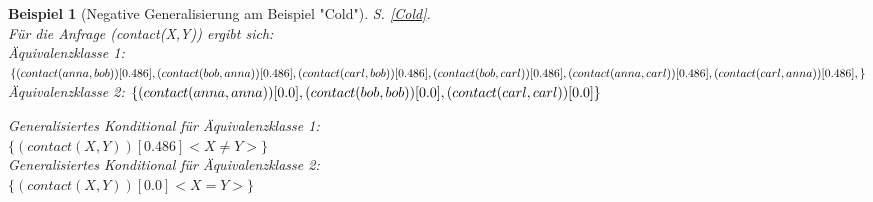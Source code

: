 \documentclass[draft]{scrreprt}
\newtheorem{Bsp}{Beispiel}[section]
\begin{document}
\begin{Bsp}[Negative Generalisierung am Beispiel "{}Cold"{}]
	S. \ref{Cold}.\\ 
	Für die Anfrage (contact(X,Y)) ergibt sich:\\
	
	\noindent
		Äquivalenzklasse 1: $ \{(contact(anna,bob))[0.486], (contact(bob,anna))[0.486],\\ (contact(carl,bob))[0.486], (contact(bob,carl))[0.486], (contact(anna,carl))[0.486],\\(contact(carl,anna))[0.486],\} $\\
		Äquivalenzklasse 2: $ \{(contact(anna,anna))[0.0], (contact(bob,bob))[0.0],  \\(contact(carl, carl))[0.0]\} $

	\noindent
		Generalisiertes Konditional für Äquivalenzklasse 1: \\$ \{(contact(X,Y))[0.486]<X \neq Y>\} $\\
	Generalisiertes Konditional für Äquivalenzklasse 2:\\ $ \{(contact(X,Y))[0.0]<X=Y>\} $\\

\end{Bsp}
\end{document}
